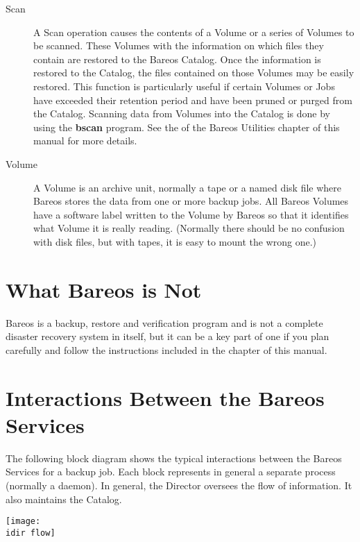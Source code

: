 \begin{description}
\item [Scan]
   A Scan operation causes the contents of a Volume or a series of Volumes
   to be scanned.  These Volumes with the information on which files they
   contain are restored to the Bareos Catalog.  Once the information is
   restored to the Catalog, the files contained on those Volumes may be
   easily restored.  This function is particularly useful if certain
   Volumes or Jobs have exceeded their retention period and have been
   pruned or purged from the Catalog.  Scanning data from Volumes into the
   Catalog is done by using the {\bf bscan} program.  See the  of the Bareos Utilities chapter of this manual for more
   details.

\item [Volume]
   A Volume is an archive unit, normally a tape or a named disk file where
   Bareos stores the data from one or more backup jobs.  All Bareos Volumes
   have a software label written to the Volume by Bareos so that it
   identifies what Volume it is really reading.  (Normally there should be
   no confusion with disk files, but with tapes, it is easy to mount the
   wrong one.)
\end{description}

\section{What Bareos is Not}

Bareos is a backup, restore and verification program and is not a
complete disaster recovery system in itself, but it can be a key part of one
if you plan carefully and follow the instructions included in the
 chapter of this manual.

\section{Interactions Between the Bareos Services}

The following block diagram shows the typical interactions between the Bareos
Services for a backup job. Each block represents in general a separate process
(normally a daemon). In general, the Director oversees the flow of
information. It also maintains the Catalog.

\texttt{[image: \\idir flow]}
